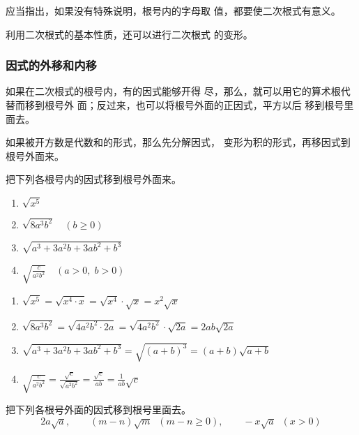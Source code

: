 应当指出，如果没有特殊说明，根号内的字母取
值，都要使二次根式有意义。

利用二次根式的基本性质，还可以进行二次根式
的变形。

\subsubsection{因式的外移和内移}
如果在二次根式的根号内，有的因式能够开得
尽，那么，就可以用它的算术根代替而移到根号外
面；反过来，也可以将根号外面的正因式，平方以后
移到根号里面去。

如果被开方数是代数和的形式，那么先分解因式，
变形为积的形式，再移因式到根号外面来。

\begin{example}
    把下列各根号内的因式移到根号外面来。
    \begin{multicols}{2}
     \begin{enumerate}
    \item $\sqrt{x^{5}}$
    \item $\sqrt{8 a^{3} b^{2}}\quad (b \ge 0)$
    \item $\sqrt{a^{3}+3 a^{2} b+3 a b^{2}+b^{3}}$
    \item $\sqrt{\frac{c}{a^{2} b^{2}}}\quad (a>0,\; b>0)$
\end{enumerate}   
    \end{multicols}

\end{example}


\begin{solution}
\begin{enumerate}
    \item $\sqrt{x^{5}}=\sqrt{x^{4} \cdot x}=\sqrt{x^{4}} \cdot \sqrt{x}=x^{2} \sqrt{x}$
    \item $\sqrt{8 a^{3} b^{2}}=\sqrt{4 a^{2} b^{2} \cdot 2 a}=\sqrt{4 a^{2} b^{2}} \cdot \sqrt{2 a}=2 {a} b \sqrt{2 a}$
    \item $\sqrt{a^{3}+3 a^{2} b+3 ab^{2}+b^{3}}=\sqrt{(a+b)^{3}}=(a+b) \sqrt{a+b}$
    \item $\sqrt{\frac{c}{a^{2} b^{2}}}=\frac{\sqrt{c}}{\sqrt{a^{2} b^{2}}}=\frac{\sqrt{c}}{a b}=\frac{1}{a b} \sqrt{c}$
\end{enumerate}
\end{solution}

\begin{example}
    把下列各根号外面的因式移到根号里面去。
\[2a\sqrt{a},\qquad (m-n)\sqrt{m}\;\; (m-n\ge 0),\qquad -x\sqrt{a}\;\;(x>0) \]
\end{example}

